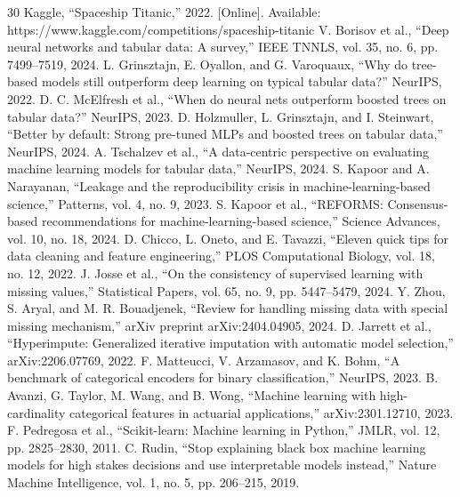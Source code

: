 \documentclass[conference]{IEEEtran}
\begin{document}
\begin{thebibliography}{30}
 Kaggle, ``Spaceship Titanic,'' 2022. [Online]. Available: https://www.kaggle.com/competitions/spaceship-titanic
 V. Borisov et al., ``Deep neural networks and tabular data: A survey,'' IEEE TNNLS, vol. 35, no. 6, pp. 7499--7519, 2024.
 L. Grinsztajn, E. Oyallon, and G. Varoquaux, ``Why do tree-based models still outperform deep learning on typical tabular data?'' NeurIPS, 2022.
 D. C. McElfresh et al., ``When do neural nets outperform boosted trees on tabular data?'' NeurIPS, 2023.
 D. Holzmuller, L. Grinsztajn, and I. Steinwart, ``Better by default: Strong pre-tuned MLPs and boosted trees on tabular data,'' NeurIPS, 2024.
 A. Tschalzev et al., ``A data-centric perspective on evaluating machine learning models for tabular data,'' NeurIPS, 2024.
 S. Kapoor and A. Narayanan, ``Leakage and the reproducibility crisis in machine-learning-based science,'' Patterns, vol. 4, no. 9, 2023.
 S. Kapoor et al., ``REFORMS: Consensus-based recommendations for machine-learning-based science,'' Science Advances, vol. 10, no. 18, 2024.
 D. Chicco, L. Oneto, and E. Tavazzi, ``Eleven quick tips for data cleaning and feature engineering,'' PLOS Computational Biology, vol. 18, no. 12, 2022.
 J. Josse et al., ``On the consistency of supervised learning with missing values,'' Statistical Papers, vol. 65, no. 9, pp. 5447--5479, 2024.
 Y. Zhou, S. Aryal, and M. R. Bouadjenek, ``Review for handling missing data with special missing mechanism,'' arXiv preprint arXiv:2404.04905, 2024.
 D. Jarrett et al., ``Hyperimpute: Generalized iterative imputation with automatic model selection,'' arXiv:2206.07769, 2022.
 F. Matteucci, V. Arzamasov, and K. Bohm, ``A benchmark of categorical encoders for binary classification,'' NeurIPS, 2023.
 B. Avanzi, G. Taylor, M. Wang, and B. Wong, ``Machine learning with high-cardinality categorical features in actuarial applications,'' arXiv:2301.12710, 2023.
 F. Pedregosa et al., ``Scikit-learn: Machine learning in Python,'' JMLR, vol. 12, pp. 2825--2830, 2011.
 C. Rudin, ``Stop explaining black box machine learning models for high stakes decisions and use interpretable models instead,'' Nature Machine Intelligence, vol. 1, no. 5, pp. 206--215, 2019.

\end{thebibliography}
\end{document}
